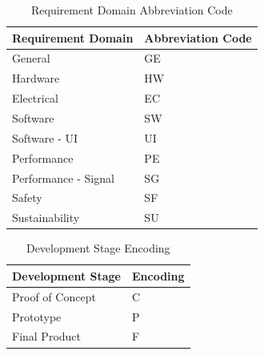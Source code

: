 \bgroup
\def\arraystretch{1.5}
\begin{table}[H]
\centering
\begin{tabular}{ | m{7cm} | m{7cm}| } 
\hline
\rowcolor{lightgray} \textbf{Requirement Domain} & \textbf{Abbreviation Code} \\ 
\hline
 General & GE\\ 
\hline
 Hardware & HW\\ 
\hline
 Electrical & EC\\  
\hline
 Software & SW\\ 
\hline
 Software - UI & UI\\ 
\hline
 Performance & PE\\ 
\hline
 Performance - Signal & SG\\ 
\hline
 Safety & SF\\ 
\hline
 Sustainability & SU\\ 
\hline
\end{tabular}
\caption{Requirement Domain Abbreviation Code}
\end{table}

\bgroup
\def\arraystretch{1.5}
\begin{table}[H]
\centering
\begin{tabular}{ | m{7cm} | m{7cm}| } 
\hline
\rowcolor{lightgray} \textbf{Development Stage} & \textbf{Encoding} \\ 
\hline
Proof of Concept & C\\ 
\hline
Prototype & P\\ 
\hline
Final Product & F\\  
\hline
\end{tabular}
\caption{Development Stage Encoding}
\end{table}	
	
	
%



















